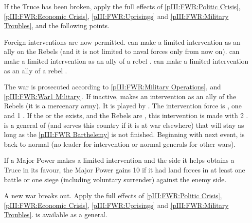 \begin{digressions}
  \phadm
  \aparag If the Truce has been broken, apply the full effects of
  \ref{pIII:FWR:Politic Crisis}, \ref{pIII:FWR:Economic Crisis},
  \ref{pIII:FWR:Uprisings} and \ref{pIII:FWR:Military Troubles}, and the
  following points.

  \phdipl
  \aparag Foreign interventions are now permitted.
  \aparag \REB can make a limited intervention as an ally on the Rebels (and
  it is not limited to naval forces only from now on).
  \aparag \HOL can make a limited intervention as an ally of a rebel \hug.
  \aparag \SPA can make a limited intervention as an ally of a rebel \lig.

  \phmil
  \aparag The war is prosecuted according to \ref{pIII:FWR:Military
    Operations}, and \ref{pIII:FWR:War1 Military}.
   If inactive, \paysPalatinat makes an
  intervention as an ally of the Rebels (it is a mercenary army). It is played
  by \REB. The intervention force is , one \ARMY
  \faceplus and 1 \DT.  If the  or the
   exists, and the Rebels are \hug, this
  intervention is made with 2 \ARMY \faceplus.   is a
  general of \paysPalatinat (and serves this country if it is at war
  elsewhere) that will stay as long as the \ref{pIII:FWR Barthelemy} is not
  finished. Beginning with next event, \paysPalatinat is back to normal (no
  leader for intervention or normal generals for other wars).

  \phpaix
  \aparag If a Major Power makes a limited intervention and the side it helps
  obtains a Truce in its favour, the Major Power gains 10 \PV if it had land
  forces in at least one battle or one siege (including voluntary surrender)
  against the enemy side.

\end{digressions}





\phevnt
\aparag A new war breaks out. Apply the full effects of \ref{pIII:FWR:Politic
  Crisis}, \ref{pIII:FWR:Economic Crisis}, \ref{pIII:FWR:Uprisings} and
\ref{pIII:FWR:Military Troubles}.
\aparag \leaderNavarre is available as a \paysHuguenots general.

